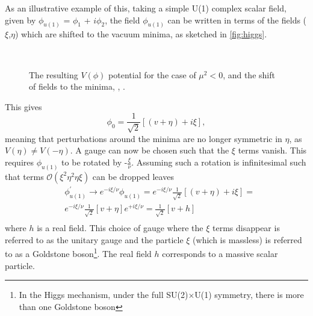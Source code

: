 As an illustrative example of this, taking a simple U(1) complex scalar field, given by $\phi_{u(1)}$ = $\phi_{1}$ + $i\phi_{2}$, the field $\phi_{u(1)}$ can be written in terms of the fields ($\xi$,$\eta$) which are shifted to the vacuum minima, as sketched in \autoref{fig:higgs}.
\begin{figure}[ht!]
  \centering
  \\
           \caption{The resulting $V(\phi)$ potential for the case of $\mu^{2}<0$, \protect{}  and the shift of fields to the minima, \protect{}, \cite{higgs}.}
           \label{fig:higgs}
\end{figure}
This gives
\begin{equation}
  \phi_{0} = \frac{1}{\sqrt{2}}[(v+\eta) + i\xi],
  \end{equation}
meaning that perturbations around the minima are no longer symmetric in $\eta$, as $V(\eta)\neq V(-\eta)$.
A gauge can now be chosen such that the $\xi$ terms vanish.  This requires $\phi_{u(1)}$ to be rotated by -$\frac{\xi}{\nu}$. Assuming such a rotation is infinitesimal such that terms $\mathcal{O}(\xi^{2}\eta^{2}\eta\xi)$ can be dropped leaves
\begin{equation}
  \begin{split}
    &\phi^{'}_{u(1)} \to e^{-i\xi/\nu}\phi_{u(1)}  = e^{-i\xi/\nu}\frac{1}{\sqrt{2}}[(v+\eta) + i\xi] = \\
    & e^{-i\xi/\nu}\frac{1}{\sqrt{2}}[v+\eta]e^{+i\xi/\nu} = \frac{1}{\sqrt{2}}[v+h] \\
    \end{split}
\end{equation}
where $h$ is a real field. This choice of gauge where the $\xi$ terms disappear is referred to as the unitary gauge and the particle $\xi$ (which is massless) is referred to as a Goldstone boson\footnote{In the Higgs mechanism, under the full SU(2)$\times$U(1) symmetry, there is more than one Goldstone boson}. The real field $h$ corresponds to a massive scalar particle. %


